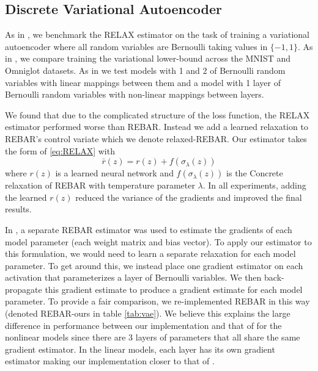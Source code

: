 \documentclass{article}
\newcommand{\relaxed}{r}
\begin{document}
\subsection{Discrete Variational Autoencoder}
As in \citep{tucker2017rebar}, we benchmark the RELAX estimator on the task of training a variational autoencoder \cite{VAE} where all random variables are Bernoulli taking values in $\{-1, 1\}$. As in \cite{tucker2017rebar}, we compare training the variational lower-bound across the MNIST \cite{MNIST} and Omniglot \cite{OMNIGLOT} datasets. As in \cite{tucker2017rebar} we test models with 1 and 2 of Bernoulli random variables with linear mappings between them and a model with 1 layer of Bernoulli random variables with non-linear mappings between layers.

We found that due to the complicated structure of the loss function, the RELAX estimator performed worse than REBAR. Instead we add a learned relaxation to REBAR's control variate which we denote relaxed-REBAR. Our estimator takes the form of \ref{eq:RELAX} with $$\bar \relaxed(z) = \relaxed(z) + f(\sigma_\lambda(z))$$ where $\relaxed(z)$ is a learned neural network and $f(\sigma_\lambda(z))$ is the Concrete relaxation of REBAR with temperature parameter $\lambda$. In all experiments, adding the learned $\relaxed(z)$ reduced the variance of the gradients and improved the final results. 

In \citep{tucker2017rebar}, a separate REBAR estimator was used to estimate the gradients of each model parameter (each weight matrix and bias vector). To apply our estimator to this formulation, we would need to learn a separate relaxation for each model parameter. To get around this, we instead place one gradient estimator on each activation that parameterizes a layer of Bernoulli variables. We then back-propagate this gradient estimate to produce a gradient estimate for each model parameter. To provide a fair comparison, we re-implemented REBAR in this way (denoted REBAR-ours in table \ref{tab:vae}). We believe this explains the large difference in performance between our implementation and that of \citep{tucker2017rebar} for the nonlinear models since there are 3 layers of parameters that all share the same gradient estimator. In the linear models, each layer has its own gradient estimator making our implementation closer to that of \citep{tucker2017rebar}.
\end{document}
